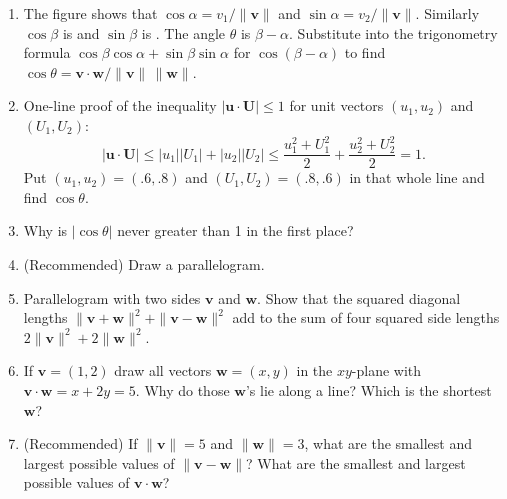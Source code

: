 \documentclass[14pt, a4paper]{article}
\begin{document}
\begin{enumerate}[resume]
    \item The figure shows that $\cos\alpha = v_1/\|\boldsymbol{v}\|$ and $\sin\alpha = v_2/\|\boldsymbol{v}\|$. Similarly $\cos\beta$ is \underline{\hspace{1cm}} and $\sin\beta$ is \underline{\hspace{1cm}}. The angle $\theta$ is $\beta - \alpha$. Substitute into the trigonometry formula $\cos\beta \cos\alpha + \sin\beta \sin\alpha$ for $\cos(\beta - \alpha)$ to find
          $
              \cos\theta = \boldsymbol{v} \cdot \boldsymbol{w} / \|\boldsymbol{v}\| \, \|\boldsymbol{w}\|.
          $

    \item One-line proof of the inequality $|\boldsymbol{u} \cdot \boldsymbol{U}| \le 1$ for unit vectors $(u_1, u_2)$ and $(U_1, U_2)$:
          \[
              |\boldsymbol{u} \cdot \boldsymbol{U}|
              \le |u_1||U_1| + |u_2||U_2|
              \le \frac{u_1^2 + U_1^2}{2} + \frac{u_2^2 + U_2^2}{2} = 1.
          \]
          Put $(u_1, u_2) = (.6, .8)$ and $(U_1, U_2) = (.8, .6)$ in that whole line and find $\cos\theta$.

    \item Why is $|\cos\theta|$ never greater than 1 in the first place?

    \item (Recommended) Draw a parallelogram.

    \item Parallelogram with two sides $\boldsymbol{v}$ and $\boldsymbol{w}$. Show that the squared diagonal lengths $\|\boldsymbol{v} + \boldsymbol{w}\|^2 + \|\boldsymbol{v} - \boldsymbol{w}\|^2$ add to the sum of four squared side lengths $2\|\boldsymbol{v}\|^2 + 2\|\boldsymbol{w}\|^2$.

    \item If $\boldsymbol{v} = (1,2)$ draw all vectors $\boldsymbol{w} = (x,y)$ in the $xy$-plane with $\boldsymbol{v} \cdot \boldsymbol{w} = x + 2y = 5$. Why do those $\boldsymbol{w}$'s lie along a line? Which is the shortest $\boldsymbol{w}$?

    \item (Recommended) If $\|\boldsymbol{v}\| = 5$ and $\|\boldsymbol{w}\| = 3$, what are the smallest and largest possible values of $\|\boldsymbol{v} - \boldsymbol{w}\|$? What are the smallest and largest possible values of $\boldsymbol{v} \cdot \boldsymbol{w}$?
\end{enumerate}
\end{document}
